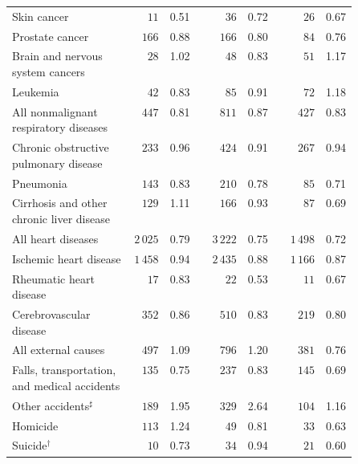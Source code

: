 \documentclass[]{article}
\begin{document}
\begin{table}[H]
\begin{tabular}{p{0.5\linewidth}rrcrrcrr}
  \hspace{10pt}Skin cancer & $11$ & 0.51 &  & $36$ & 0.72 &  & $26$ & 0.67 \\ 
  \hspace{10pt}Prostate cancer & $166$ & 0.88 &  & $166$ & 0.80 &  & $84$ & 0.76 \\ 
  \hspace{10pt}Brain and nervous system cancers & $28$ & 1.02 &  & $48$ & 0.83 &  & $51$ & 1.17 \\ 
  Leukemia & $42$ & 0.83 &  & $85$ & 0.91 &  & $72$ & 1.18 \\ 
  \hspace{10pt}All nonmalignant respiratory diseases & $447$ & 0.81 &  & $811$ & 0.87 &  & $427$ & 0.83 \\ 
  \hspace{10pt}Chronic obstructive pulmonary disease & $233$ & 0.96 &  & $424$ & 0.91 &  & $267$ & 0.94 \\ 
  Pneumonia & $143$ & 0.83 &  & $210$ & 0.78 &  & $85$ & 0.71 \\ 
  Cirrhosis and other chronic liver disease & $129$ & 1.11 &  & $166$ & 0.93 &  & $87$ & 0.69 \\ 
  \hspace{10pt}All heart diseases & $2\,025$ & 0.79 &  & $3\,222$ & 0.75 &  & $1\,498$ & 0.72 \\ 
  \hspace{10pt}Ischemic heart disease & $1\,458$ & 0.94 &  & $2\,435$ & 0.88 &  & $1\,166$ & 0.87 \\ 
  Rheumatic heart disease & $17$ & 0.83 &  & $22$ & 0.53 &  & $11$ & 0.67 \\ 
  Cerebrovascular disease & $352$ & 0.86 &  & $510$ & 0.83 &  & $219$ & 0.80 \\ 
  \hspace{10pt}All external causes & $497$ & 1.09 &  & $796$ & 1.20 &  & $381$ & 0.76 \\ 
  \hspace{10pt}Falls, transportation, and medical accidents & $135$ & 0.75 &  & $237$ & 0.83 &  & $145$ & 0.69 \\ 
  \hspace{10pt}Other accidents$^\sharp$ & $189$ & 1.95 &  & $329$ & 2.64 &  & $104$ & 1.16 \\ 
  \hspace{10pt}Homicide & $113$ & 1.24 &  & $49$ & 0.81 &  & $33$ & 0.63 \\ 
  \hspace{10pt}Suicide$^\dagger$ & $10$ & 0.73 &  & $34$ & 0.94 &  & $21$ & 0.60 \\ 

\end{tabular}
\end{table}
\end{document}

